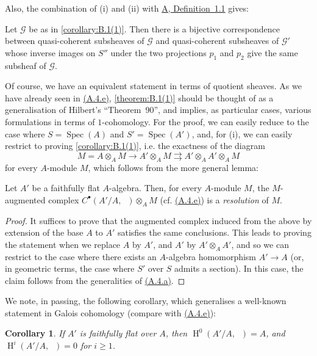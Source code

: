 \documentclass{article}
\theoremstyle{plain}
\newenvironment{lemma}[1]
  {\renewcommand\theinnercustomlemma{#1}\innercustomlemma}
  {\endinnercustomlemma}
\newenvironment{corollary}[1]
  {\renewcommand\theinnercustomcorollary{#1}\innercustomcorollary}
  {\endinnercustomcorollary}
\newtheorem*{corollary*}{Corollary}
\theoremstyle{definition}
\newcommand{\sh}[1]{{\mathscr{#1}}}
\renewcommand{\geq}{\geqslant}
\DeclareMathOperator{\HH}{H}
\DeclareMathOperator{\Ga}{G_a}
\DeclareMathOperator{\Spec}{Spec}
\begin{document}
Also, the combination of (i) and (ii) with \hyperref[definition:A.1.1]{A, Definition~1.1} gives:

\begin{corollary}{2}
\label{corollary:B.1(2)}
  Let $\sh{G}$ be as in \cref{corollary:B.1(1)}.
  Then there is a bijective correspondence between quasi-coherent subsheaves of $\sh{G}$ and quasi-coherent subsheaves of $\sh{G}'$ whose inverse images on $S''$ under the two projections $p_1$ and $p_2$ give the same subsheaf of $\sh{G}$.
\end{corollary}

Of course, we have an equivalent statement in terms of quotient sheaves.
As we have already seen in \hyperref[A.4.e]{(A.4.e)}, \cref{theorem:B.1(1)} should be thought of as a generalisation of Hilbert's ``Theorem~90'', and implies, as particular cases, various formulations in terms of $1$-cohomology.
For the proof, we can easily reduce to the case where $S=\Spec(A)$ and $S'=\Spec(A')$, and, for (i), we can easily restrict to proving \cref{corollary:B.1(1)}, i.e. the exactness of the diagram
\[
  M
  = A\otimes_A M
  \to A'\otimes_A M
  \rightrightarrows A'\otimes_A A'\otimes_A M
\]
for every $A$-module $M$, which follows from the more general lemma:

\begin{lemma}{1.1}
  Let $A'$ be a faithfully flat $A$-algebra.
  Then, for every $A$-module $M$, the $M$-augmented complex $C^\bullet(A'/A,\Ga)\otimes_A M$ (cf. \hyperref[A.4.e]{(A.4.e)}) is a \emph{resolution} of $M$.
\end{lemma}

\begin{proof}
  It suffices to prove that the augmented complex induced from the above by extension of the base $A$ to $A'$ satisfies the same conclusions.
  This leads to proving the statement when we replace $A$ by $A'$, and $A'$ by $A'\otimes_A A'$, and so we can restrict to the case where there exists an $A$-algebra homomorphism $A'\to A$ (or, in geometric terms, the case where $S'$ over $S$ admits a section).
  In this case, the claim follows from the generalities of \hyperref[A.4.a]{(A.4.a)}.
\end{proof}

We note, in passing, the following corollary, which generalises a well-known statement in Galois cohomology (compare with \hyperref[A.4.e]{(A.4.e)}):

\begin{corollary*}
  If $A'$ is faithfully flat over $A$, then $\HH^0(A'/A,\Ga)=A$, and $\HH^i(A'/A,\Ga)=0$ for $i\geq1$.
\end{corollary*}
\end{document}
